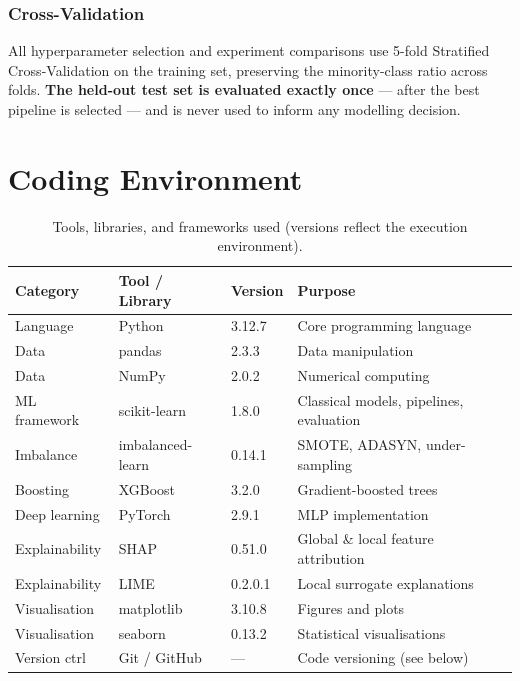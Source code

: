 \documentclass[11pt,a4paper]{article}
\begin{document}
\subsubsection{Cross-Validation}

{ All hyperparameter selection and experiment comparisons use 5-fold Stratified Cross-Validation on the training set, preserving the minority-class ratio across folds.
\textbf{The held-out test set is evaluated exactly once} — after the best pipeline is selected — and is never used to inform any modelling decision.}

\section{Coding Environment}
\label{sec:env}

\begin{table}[H]
  \centering
  \caption{Tools, libraries, and frameworks used (versions reflect the execution environment).}
  \label{tab:environment}
  \begin{tabular}{llll}
    \toprule
    \textbf{Category} & \textbf{Tool / Library} & \textbf{Version} & \textbf{Purpose} \\
    \midrule
    Language       & Python          & 3.12.7  & Core programming language \\
    Data           & pandas          & 2.3.3   & Data manipulation \\
    Data           & NumPy           & 2.0.2   & Numerical computing \\
    ML framework   & scikit-learn    & 1.8.0   & Classical models, pipelines, evaluation \\
    Imbalance      & imbalanced-learn & 0.14.1 & SMOTE, ADASYN, under-sampling \\
    Boosting       & XGBoost         & 3.2.0   & Gradient-boosted trees \\
    Deep learning  & PyTorch         & 2.9.1   & MLP implementation \\
    Explainability & SHAP            & 0.51.0  & Global \& local feature attribution \\
    Explainability & LIME            & 0.2.0.1 & Local surrogate explanations \\
    Visualisation  & matplotlib      & 3.10.8  & Figures and plots \\
    Visualisation  & seaborn         & 0.13.2  & Statistical visualisations \\
    Version ctrl   & Git / GitHub    & —       & Code versioning (see below) \\
    \bottomrule
  \end{tabular}
\end{table}
\end{document}
